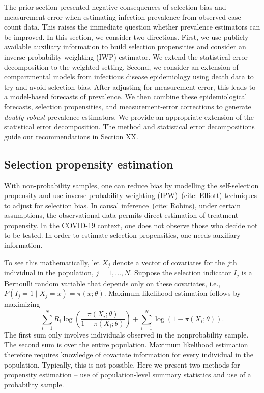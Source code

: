 \documentclass[11pt]{amsart}
\begin{document}
The prior section presented negative consequences of selection-bias and measurement error when estimating infection prevalence from observed case-count data.  This raises the immediate question whether prevalence estimators can be improved.  In this section, we consider two directions. First, we use publicly available auxiliary information to build selection propensities and consider an inverse probability weighting (IWP) estimator. We extend the statistical error decomposition to the weighted setting. Second, we consider an extension of compartmental models from infectious disease epidemiology using death data to try and avoid selection bias.  After adjusting for measurement-error, this leads to a model-based forecasts of prevalence. We then combine these epidemiological forecasts, selection propensities, and measurement-error corrections to generate \emph{doubly robust} prevalence estimators. We provide an appropriate extension of the statistical error decomposition. The method and statistical error decompositions guide our recommendations in Section XX.

\subsection{Selection propensity estimation}

With non-probability samples, one can reduce bias by modelling the self-selection propensity and use inverse probability weighting (IPW)~(cite: Elliott) techniques to adjust for selection bias.  In causal inference~(cite: Robins), under certain assumptions, the observational data permits direct estimation of treatment propensity.  In the COVID-19 context, one does not observe those who decide not to be tested.  In order to estimate selection propensities, one needs auxiliary information.

To see this mathematically, let $X_j$ denote a vector of covariates for the $j$th individual in the population, $j=1,\ldots,N$.  Suppose the selection indicator $I_j$ is a Bernoulli random variable that depends only on these covariates, i.e., $P(I_j = 1 \mid X_j = x) = \pi (x; \theta)$.  Maximum likelihood estimation follows by maximizing
\begin{equation}
\label{eq:propensity}
\sum_{i=1}^N R_i \log \left( \frac{\pi (X_i; \theta)}{1-\pi(X_i; \theta)} \right) + \sum_{i=1}^N \log \left( 1 - \pi (X_i; \theta) \right).
\end{equation}
The first sum only involves individuals observed in the nonprobability sample.
The second sum is over the entire population.  Maximum likelihood estimation therefore requires knowledge of covariate information for every individual in the population.  Typically, this is not possible.  Here we present two methods for propensity estimation -- use of population-level summary statistics and use of a probability sample.
\end{document}
